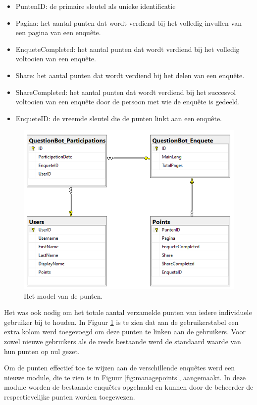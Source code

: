 \begin{itemize}
    \item PuntenID: de primaire sleutel als unieke identificatie
    \item Pagina: het aantal punten dat wordt verdiend bij het volledig invullen van een pagina van een enquête.
    \item EnqueteCompleted: het aantal punten dat wordt verdiend bij het volledig voltooien van een enquête.
    \item Share: het aantal punten dat wordt verdiend bij het delen van een enquête.
    \item ShareCompleted: het aantal punten dat wordt verdiend bij het succesvol voltooien van een enquête door de persoon met wie de enquête is gedeeld.
    \item EnqueteID: de vreemde sleutel die de punten linkt aan een enquête.
\end{itemize}

\begin{figure}
    \includegraphics[width=\linewidth]{DBDiagram.png}
    \caption{Het model van de punten.}
    \label{fig:dbdiagram}
\end{figure}

Het was ook nodig om het totale aantal verzamelde punten van iedere individuele gebruiker bij te houden. In Figuur \ref{fig:dbdiagram} is te zien dat aan de gebruikerstabel een extra kolom werd toegevoegd om deze punten te linken aan de gebruikers. Voor zowel nieuwe gebruikers als de reeds bestaande werd de standaard waarde van hun punten op nul gezet.

Om de punten effectief toe te wijzen aan de verschillende enquêtes werd een nieuwe module, die te zien is in Figuur \ref{fig:managepoints}, aangemaakt. In deze module worden de bestaande enquêtes opgehaald en kunnen door de beheerder de respectievelijke punten worden toegewezen.


